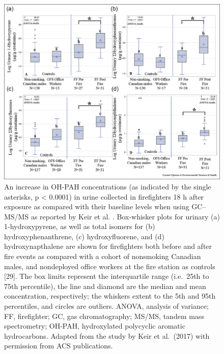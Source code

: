 \documentclass[preprint, 3p,
authoryear]{elsarticle} %
\begin{document}
\begin{figure}
\centering
\includegraphics{./Figures/Figure1.jpg}
\caption{An increase in OH-PAH concentrations (as indicated by the
single asterisks, p \textless{} 0.0001) in urine collected in
firefighters 18 h after exposure as compared with their baseline levels
when using GC--MS/MS as reported by Keir et al. \citep{29}. Box-whisker
plots for urinary (a) 1-hydroxypyrene, as well as total isomers for (b)
hydroxyphenanthrene, (c) hydroxyfluorene, and (d) hydroxynapthalene are
shown for firefighters both before and after fire events as compared
with a cohort of nonsmoking Canadian males, and nondeployed office
workers at the fire station as controls {[}29{]}. The box limits
represent the interquartile range (i.e.~25th to 75th percentile), the
line and diamond are the median and mean concentration, respectively;
the whiskers extent to the 5th and 95th percentiles, and circles are
outliers. ANOVA, analysis of variance; FF, firefighter; GC, gas
chromatography; MS/MS, tandem mass spectrometry; OH-PAH, hydroxylated
polycyclic aromatic hydrocarbons. Adapted from the study by Keir et
al.~(2017) with permission from ACS publications.}
\end{figure}
\end{document}
